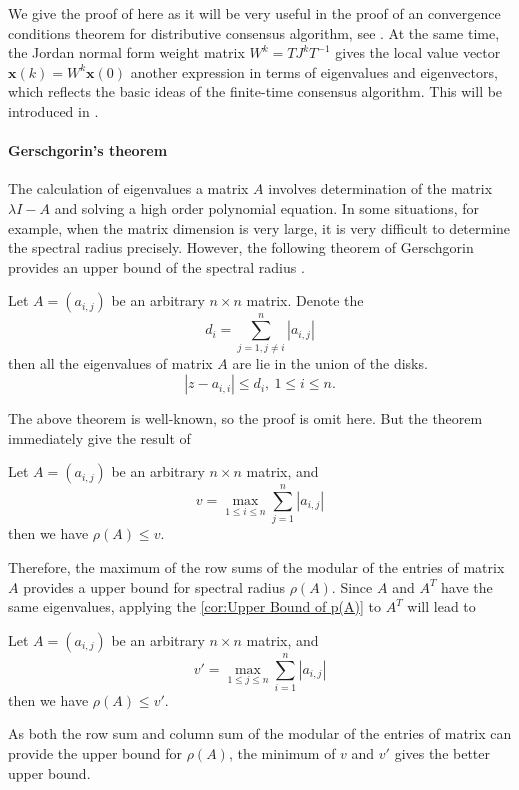 We give the proof of 
here as it will be very useful in the proof of an convergence conditions
theorem for distributive consensus algorithm, see .
At the same time, the Jordan normal form weight matrix $W^{k}=TJ^{k}T^{-1}$
gives the local value vector $\mathbf{x}\left(k\right)=W^{k}\mathbf{x}\left(0\right)$
another expression in terms of eigenvalues and eigenvectors, which
reflects the basic ideas of the finite-time consensus algorithm. This
will be introduced in . 




\paragraph{Gerschgorin's theorem}

The calculation of eigenvalues a matrix $A$ involves determination
of the matrix $\lambda I-A$ and solving a high order polynomial equation.
In some situations, for example, when the matrix dimension is very
large, it is very difficult to determine the spectral radius precisely.
However, the following theorem of Gerschgorin provides an upper bound
of the spectral radius \cite{Horn1990}.
\begin{thm}
Let $A=\left(a_{i,j}\right)$ be an arbitrary $n\times n$ matrix.
Denote the 
\begin{equation}
d_{i}=\sum_{j=1,j\neq i}^{n}\left|a_{i,j}\right|
\end{equation}
then all the eigenvalues of matrix $A$ are lie in the union of the
disks.
\begin{equation}
\left|z-a_{i,i}\right|\leq d_{i},\ 1\leq i\leq n.
\end{equation}

\end{thm}
The above theorem is well-known, so the proof is omit here. But the
theorem immediately give the result of
\begin{cor}
\label{cor:Upper Bound of p(A)}Let $A=\left(a_{i,j}\right)$ be an
arbitrary $n\times n$ matrix, and 
\begin{equation}
v=\max_{1\leq i\leq n}\sum_{j=1}^{n}\left|a_{i,j}\right|
\end{equation}
then we have $\rho\left(A\right)\leq v$. 
\end{cor}
Therefore, the maximum of the row sums of the modular of the entries
of matrix $A$ provides a upper bound for spectral radius $\rho\left(A\right)$.
Since $A$ and $A^{T}$ have the same eigenvalues, applying the \ref{cor:Upper Bound of p(A)}
to $A^{T}$ will lead to 
\begin{cor}
Let $A=\left(a_{i,j}\right)$ be an arbitrary $n\times n$ matrix,
and 
\begin{equation}
v'=\max_{1\leq j\leq n}\sum_{i=1}^{n}\left|a_{i,j}\right|
\end{equation}
then we have $\rho\left(A\right)\leq v'$.
\end{cor}
As both the row sum and column sum of the modular of the entries of
matrix can provide the upper bound for $\rho\left(A\right)$, the
minimum of $v$ and $v'$ gives the better upper bound. 



